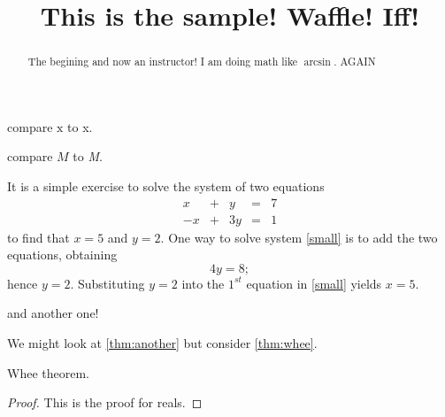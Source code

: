 \documentclass{ximera}
\title[Breal-grond]{This is the sample! Waffle!  Iff!}
\begin{document}
\begin{abstract}
  The begining and now an instructor! I am doing math like $\arcsin$. AGAIN
\end{abstract}

\maketitle

\mypreamble

compare $\mathrm{x}$ to x.

compare $M$ to \textit{M}.

It is a simple exercise to solve the system of two equations
\begin{equation} \label{small}
\begin{array}{rcrcr}
 x & + & y & = & 7 \\
-x & + & 3y & = & 1
\end{array}
\end{equation}
to find that $x=5$ and $y=2$.  One way to solve
system \eqref{small} is to add the two equations, obtaining
\[
4y=8;
\]
hence $y=2$.  Substituting $y=2$ into the $1^{st}$ equation in
\ref{small} yields $x=5$.





and another one!



We might look at \ref{thm:another} but consider \ref{thm:whee}.

\begin{theorem}
  \label{thm:whee}  Whee theorem.
\end{theorem}
\begin{proof}
This is the proof for reals.
\end{proof}
\end{document}
